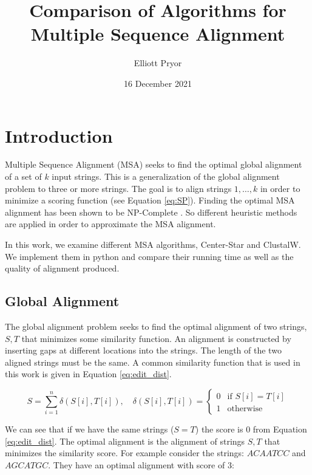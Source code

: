 \documentclass[11pt]{article}
\title{Comparison of Algorithms for Multiple Sequence Alignment}
\author{Elliott Pryor}
\date{16 December 2021}
\begin{document}
\maketitle

\section{Introduction}
\label{sec:intro}

Multiple Sequence Alignment (MSA) seeks to find the optimal global alignment of a set of $k$ input strings.
This is a generalization of the global alignment problem to three or more strings.
The goal is to align strings $1, \dots, k$ in order to minimize a scoring function (see Equation \ref{eq:SP}). 
Finding the optimal MSA alignment has been shown to be NP-Complete \cite{wang1994complexity}.
So different heuristic methods are applied in order to approximate the MSA alignment.

In this work, we examine different MSA algorithms, Center-Star and ClustalW. 
We implement them in python and compare their running time as well as the quality of alignment produced.

\subsection{Global Alignment}
The global alignment problem seeks to find the optimal alignment of two strings, 
$S, T$ that minimizes some similarity function.
An alignment is constructed by inserting gaps at different locations into the strings. 
The length of the two aligned strings must be the same.
A common similarity function that is used in this work is given in Equation \ref{eq:edit_dist}.

\begin{equation}
    S = \sum_{i = 1}^n \delta(S[i], T[i]), \quad \delta(S[i], T[i]) = \begin{cases}
        0 & \text{if } S[i] = T[i] \\
        1 & \text{otherwise}
    \end{cases}
    \label{eq:edit_dist}
\end{equation}

We can see that if we have the same strings ($S = T$) the score is $0$ from Equation \ref{eq:edit_dist}.
The optimal alignment is the alignment of strings $S, T$ that minimizes the similarity score.  
For example consider the strings: $ACAATCC$ and $AGCATGC$. They have an optimal alignment with score of 3:
\end{document}
